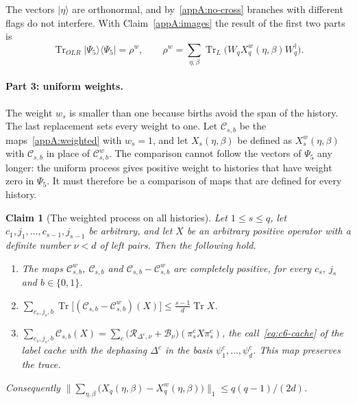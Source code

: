 \documentclass[11pt,letterpaper]{article}
\newtheorem{claim}[theorem]{Claim}
\theoremstyle{definition}\newtheorem{definition}[theorem]{Definition}
\newcommand{\Tr}{\operatorname{Tr}}
\newcommand{\ket}[1]{\lvert#1\rangle}
\newcommand{\bra}[1]{\langle#1\rvert}
\newcommand{\proj}[1]{\ket{#1}\!\bra{#1}}
\begin{document}
The vectors $\ket\eta$ are orthonormal, and by~\eqref{appA:no-cross}
branches with different flags do not interfere. With
Claim~\ref{appA:images} the result of the first two parts is
\begin{equation}\label{appA:weighted-state}
 \Tr_{OLR}\proj{\Psi_5}=\rho^{w},\qquad
 \rho^{w}=\sum_{\eta,\beta}\Tr_L\bigl(W_qX^{w}_q(\eta,\beta)
   W_q^\dagger\bigr).
\end{equation}

\paragraph{Part 3: uniform weights.}
The weight $w_s$ is smaller than one because births avoid the span of
the history. The last replacement sets every weight to one. Let
$\mathcal C_{s,b}$ be the maps~\eqref{appA:weighted} with $w_s=1$,
and let $X_s(\eta,\beta)$ be defined as $X^{w}_s(\eta,\beta)$ with
$\mathcal C_{s,b}$ in place of $\mathcal C^{w}_{s,b}$. The comparison cannot follow
the vectors of $\Psi_5$ any longer: the uniform process gives positive
weight to histories that have weight zero in $\Psi_5$. It must
therefore be a comparison of maps that are defined for every history.

\begin{claim}[The weighted process on all histories]\label{appA:histories}
Let $1\le s\le q$, let $c_1,j_1,\dots,c_{s-1},j_{s-1}$ be arbitrary,
and let $X$ be an arbitrary positive operator with a definite number
$\nu<d$ of left pairs. Then the following hold.
\begin{enumerate}\renewcommand{\labelenumi}{(\roman{enumi})}\setlength\itemsep{0pt}
\item The maps $\mathcal C^{w}_{s,b}$, $\mathcal C_{s,b}$ and
$\mathcal C_{s,b}-\mathcal C^{w}_{s,b}$ are completely positive, for
every $c_s$, $j_s$ and $b\in\{0,1\}$.
\item
$\sum_{c_s,j_s,b}\Tr\bigl[(\mathcal C_{s,b}-\mathcal C^{w}_{s,b})(X)\bigr]
\le\frac{s-1}{d}\Tr X$.
\item $\sum_{c_s,j_s,b}\mathcal C_{s,b}(X)
=\sum_c\bigl(\mathcal R_{\Delta^c,\nu}+\mathcal B_\nu\bigr)
(\pi^c_sX\pi^c_s)$, the call~\eqref{eq:c6-cache} of the label cache
with the dephasing $\Delta^c$ in the basis $\psi^c_1,\dots,\psi^c_d$.
This map preserves the trace.
\end{enumerate}
Consequently
$\bigl\|\sum_{\eta,\beta}\bigl(X_q(\eta,\beta)-X^{w}_q(\eta,\beta)\bigr)
\bigr\|_1\le q(q-1)/(2d)$.
\end{claim}
\end{document}
